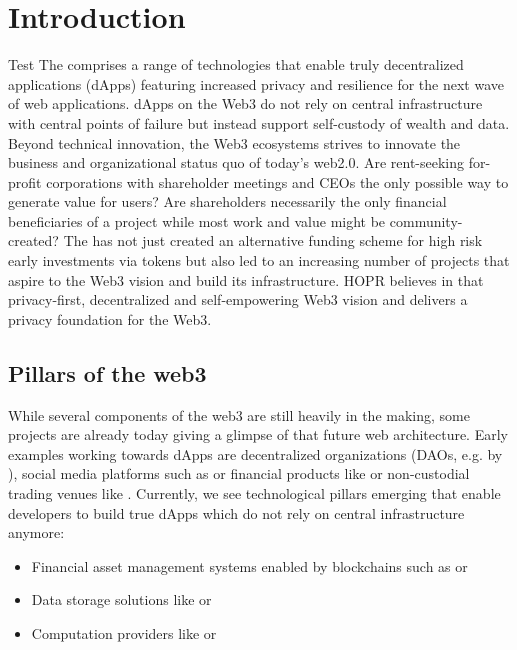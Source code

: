 \section{Introduction}

Test The  comprises a range of technologies that enable truly decentralized applications (dApps) featuring increased privacy and resilience for the next wave of web applications. dApps on the Web3 do not rely on central infrastructure with central points of failure but instead support self-custody of wealth and data. Beyond technical innovation, the Web3 ecosystems strives to innovate the business and organizational status quo of today's web2.0. Are rent-seeking for-profit corporations with shareholder meetings and CEOs the only possible way to generate value for users? Are shareholders necessarily the only financial beneficiaries of a project while most work and value might be community-created? The  has not just created an alternative funding scheme for high risk early investments via tokens but also led to an increasing number of projects that aspire to the Web3 vision and build its infrastructure. HOPR believes in that privacy-first, decentralized and self-empowering Web3 vision and delivers a privacy foundation for the Web3.

\subsection{Pillars of the web3}
While several components of the web3 are still heavily in the making, some projects are already today giving a glimpse of that future web architecture. Early examples working towards dApps are decentralized organizations (DAOs, e.g. by ), social media platforms such as  or financial products like  or non-custodial trading venues like . Currently, we see technological pillars emerging that enable developers to build true dApps which do not rely on central infrastructure anymore:
\begin{itemize}
    \item Financial asset management systems enabled by blockchains such as  or 
    \item Data storage solutions like  or 
    \item Computation providers like  or 
\end{itemize}

